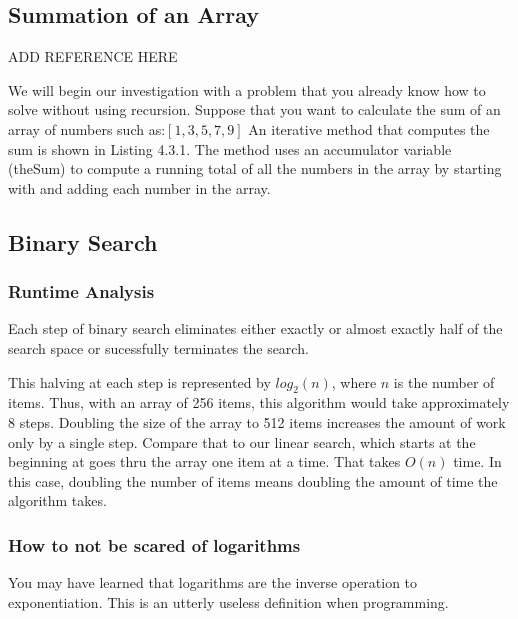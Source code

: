 \subsection{Summation of an Array}
ADD REFERENCE HERE


We will begin our investigation with a problem that you already know how to solve without using recursion. Suppose that you want to calculate the sum of an array of numbers such as:$[1, 3, 5, 7, 9]$ An iterative method that computes the sum is shown in Listing 4.3.1. The method uses an accumulator variable (theSum) to compute a running total of all the numbers in the array by starting with and adding each number in the array.



\subsection{Binary Search}






\subsubsection{Runtime Analysis}
Each step of binary search eliminates either exactly or almost exactly half of the search space or sucessfully terminates the search.

This halving at each step is represented by $log_2(n)$, where $n$ is the number of items.  Thus, with an array of 256 items, this algorithm would take approximately 8 steps. Doubling the size of the array to 512 items increases the amount of work only by a single step.   Compare that to our linear search, which starts at the beginning at goes thru the array one item at a time.  That takes $O(n)$ time.  In this case, doubling the number of items means doubling the amount of time the algorithm takes.





\subsubsection{How to not be scared of logarithms }
You may have learned that logarithms are the inverse operation to exponentiation.
This is an utterly useless definition when programming.


